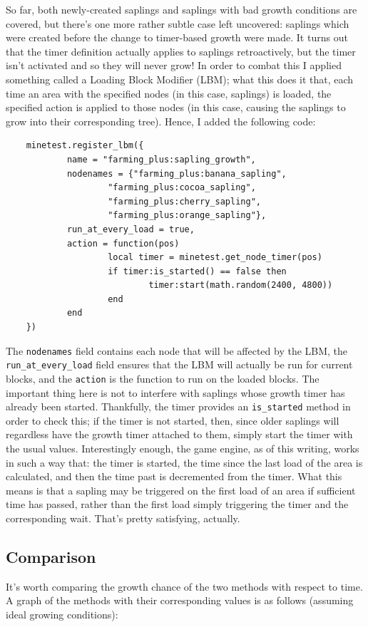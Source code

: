 \documentclass{article}
\begin{document}
So far, both newly-created saplings and saplings with bad growth conditions are covered, but there's one more rather subtle case left uncovered: saplings which were created before the change to timer-based growth were made.  It turns out that the timer definition actually applies to saplings retroactively, but the timer isn't activated and so they will never grow!  In order to combat this I applied something called a Loading Block Modifier (LBM); what this does it that, each time an area with the specified nodes (in this case, saplings) is loaded, the specified action is applied to those nodes (in this case, causing the saplings to grow into their corresponding tree).  Hence, I added the following code:
\begin{verbatim}
	minetest.register_lbm({
	        name = "farming_plus:sapling_growth",
	        nodenames = {"farming_plus:banana_sapling",
	                "farming_plus:cocoa_sapling",
	                "farming_plus:cherry_sapling",
	                "farming_plus:orange_sapling"},
	        run_at_every_load = true,
	        action = function(pos)
	                local timer = minetest.get_node_timer(pos)
	                if timer:is_started() == false then
	                        timer:start(math.random(2400, 4800))
	                end
	        end
	})
\end{verbatim}
The \texttt{nodenames} field contains each node that will be affected by the LBM, the \texttt{run_at_every_load} field ensures that the LBM will actually be run for current blocks, and the \texttt{action} is the function to run on the loaded blocks.  The important thing here is not to interfere with saplings whose growth timer has already been started.  Thankfully, the timer provides an \texttt{is_started} method in order to check this; if the timer is not started, then, since older saplings will regardless have the growth timer attached to them, simply start the timer with the usual values.  Interestingly enough, the game engine, as of this writing, works in such a way that: the timer is started, the time since the last load of the area is calculated, and then the time past is decremented from the timer.  What this means is that a sapling may be triggered on the first load of an area if sufficient time has passed, rather than the first load simply triggering the timer and the corresponding wait.  That's pretty satisfying, actually.

\subsection{Comparison}
It's worth comparing the growth chance of the two methods with respect to time.  A graph of the methods with their corresponding values is as follows (assuming ideal growing conditions):
\end{document}
